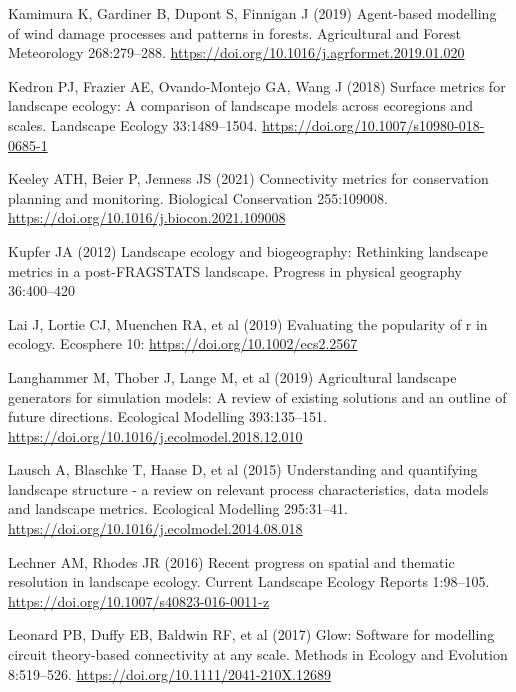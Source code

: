 \documentclass[
  10pt,
  a4paperpaper,
]{article}
\newlength{\cslhangindent}
\newenvironment{CSLReferences}[2] %
 {\begin{list}{}{%
  \setlength{\itemindent}{0pt}
  \setlength{\leftmargin}{0pt}
  \setlength{\parsep}{0pt}
  \ifodd #1
   \setlength{\leftmargin}{\cslhangindent}
   \setlength{\itemindent}{-1\cslhangindent}
  \fi
  \setlength{\itemsep}{#2\baselineskip}}}
 {\end{list}}
\begin{document}
\begin{CSLReferences}{1}{1}
Kamimura K, Gardiner B, Dupont S, Finnigan J (2019) Agent-based
modelling of wind damage processes and patterns in forests. Agricultural
and Forest Meteorology 268:279--288.
\url{https://doi.org/10.1016/j.agrformet.2019.01.020}

Kedron PJ, Frazier AE, Ovando-Montejo GA, Wang J (2018) Surface metrics
for landscape ecology: A comparison of landscape models across
ecoregions and scales. Landscape Ecology 33:1489--1504.
\url{https://doi.org/10.1007/s10980-018-0685-1}

Keeley ATH, Beier P, Jenness JS (2021) Connectivity metrics for
conservation planning and monitoring. Biological Conservation
255:109008. \url{https://doi.org/10.1016/j.biocon.2021.109008}

Kupfer JA (2012) Landscape ecology and biogeography: Rethinking
landscape metrics in a post-FRAGSTATS landscape. Progress in physical
geography 36:400--420

Lai J, Lortie CJ, Muenchen RA, et al (2019) Evaluating the popularity of
r in ecology. Ecosphere 10: \url{https://doi.org/10.1002/ecs2.2567}

Langhammer M, Thober J, Lange M, et al (2019) Agricultural landscape
generators for simulation models: A review of existing solutions and an
outline of future directions. Ecological Modelling 393:135--151.
\url{https://doi.org/10.1016/j.ecolmodel.2018.12.010}

Lausch A, Blaschke T, Haase D, et al (2015) Understanding and
quantifying landscape structure - a review on relevant process
characteristics, data models and landscape metrics. Ecological Modelling
295:31--41. \url{https://doi.org/10.1016/j.ecolmodel.2014.08.018}

Lechner AM, Rhodes JR (2016) Recent progress on spatial and thematic
resolution in landscape ecology. Current Landscape Ecology Reports
1:98--105. \url{https://doi.org/10.1007/s40823-016-0011-z}

Leonard PB, Duffy EB, Baldwin RF, et al (2017) Glow: Software for
modelling circuit theory-based connectivity at any scale. Methods in
Ecology and Evolution 8:519--526.
\url{https://doi.org/10.1111/2041-210X.12689}


\end{CSLReferences}
\end{document}
